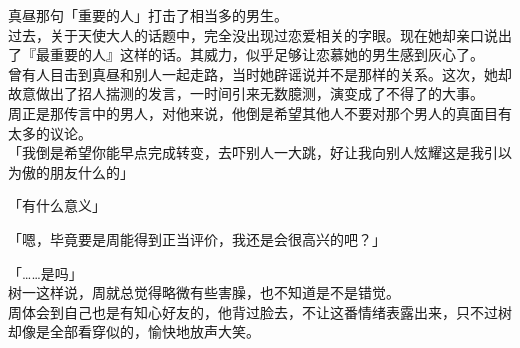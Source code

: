真昼那句「重要的人」打击了相当多的男生。\\

过去，关于天使大人的话题中，完全没出现过恋爱相关的字眼。现在她却亲口说出了『最重要的人』这样的话。其威力，似乎足够让恋慕她的男生感到灰心了。\\

曾有人目击到真昼和别人一起走路，当时她辟谣说并不是那样的关系。这次，她却故意做出了招人揣测的发言，一时间引来无数臆测，演变成了不得了的大事。\\

周正是那传言中的男人，对他来说，他倒是希望其他人不要对那个男人的真面目有太多的议论。\\

「我倒是希望你能早点完成转变，去吓别人一大跳，好让我向别人炫耀这是我引以为傲的朋友什么的」

「有什么意义」

「嗯，毕竟要是周能得到正当评价，我还是会很高兴的吧？」

「……是吗」\\

树一这样说，周就总觉得略微有些害臊，也不知道是不是错觉。\\

周体会到自己也是有知心好友的，他背过脸去，不让这番情绪表露出来，只不过树却像是全部看穿似的，愉快地放声大笑。
